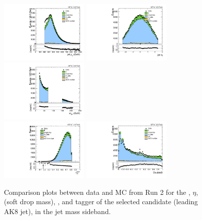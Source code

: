 \begin{figure}[htbp]
  \centering
  \includegraphics[width=0.3825\textwidth]{fig/controlPlots/SB_b1_allL_allP_allC_allD_Run2_lnujj_l2_pt.pdf}
  \includegraphics[width=0.3825\textwidth]{fig/controlPlots/SB_b1_allL_allP_allC_allD_Run2_lnujj_l2_eta.pdf}\\
  \includegraphics[width=0.3825\textwidth]{fig/controlPlots/SB_b1_allL_allP_allC_allD_Run2_mjet.pdf}\\
  \includegraphics[width=0.3825\textwidth]{fig/controlPlots/SB_b1_allL_allP_allC_allD_Run2_tau21DDT.pdf}
  \includegraphics[width=0.3825\textwidth]{fig/controlPlots/SB_b1_allL_allP_allC_allD_Run2_DoubleB.pdf}\\
  \caption{
    Comparison plots between data and MC from Run 2 for the \pt, $\eta$, \MJ (soft drop mass), \nsubjDDT, and \DoubleB tagger of the selected \Vhad candidate (leading AK8 jet), in the jet mass sideband.
  }
  \label{fig:SB_controlPlotsRun2_3}
\end{figure}

